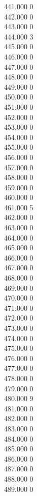 { 441.000	0 \\
 442.000	0 \\
 443.000	0 \\
 444.000	3 \\
 445.000	0 \\
 446.000	0 \\
 447.000	0 \\
 448.000	0 \\
 449.000	0 \\
 450.000	0 \\
 451.000	0 \\
 452.000	0 \\
 453.000	0 \\
 454.000	0 \\
 455.000	0 \\
 456.000	0 \\
 457.000	0 \\
 458.000	0 \\
 459.000	0 \\
 460.000	0 \\
 461.000	5 \\
 462.000	0 \\
 463.000	0 \\
 464.000	0 \\
 465.000	0 \\
 466.000	0 \\
 467.000	0 \\
 468.000	0 \\
 469.000	0 \\
 470.000	0 \\
 471.000	0 \\
 472.000	0 \\
 473.000	0 \\
 474.000	0 \\
 475.000	0 \\
 476.000	0 \\
 477.000	0 \\
 478.000	0 \\
 479.000	0 \\
 480.000	9 \\
 481.000	0 \\
 482.000	0 \\
 483.000	0 \\
 484.000	0 \\
 485.000	0 \\
 486.000	0 \\
 487.000	0 \\
 488.000	0 \\
 489.000	0 \\
}
